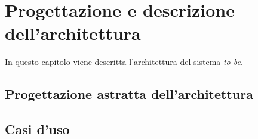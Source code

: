 \clearpage
\chapter{Progettazione e descrizione dell'architettura}\label{ch:design}
In questo capitolo viene descritta l'architettura del sistema \textit{to-be}.

\section{Progettazione astratta dell'architettura}\label{sec:architecture}

\section{Casi d'uso}\label{sec:usecases}

